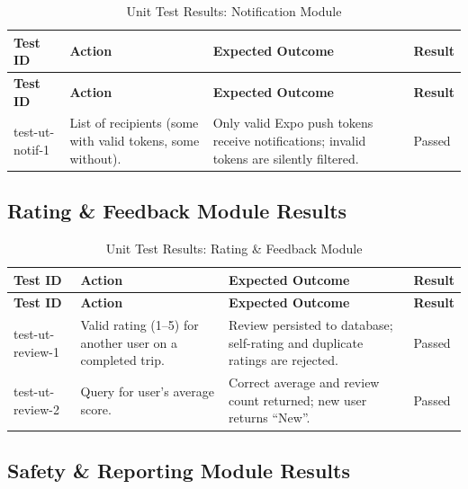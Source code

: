 \small
\begin{longtable}{|p{}|>{\raggedright\arraybackslash}p{}|>{\raggedright\arraybackslash}p{}|p{}|}
\hline
\textbf{Test ID} & \textbf{Action} & \textbf{Expected Outcome} & \textbf{Result} \\
\hline
\endfirsthead

\hline
\textbf{Test ID} & \textbf{Action} & \textbf{Expected Outcome} & \textbf{Result} \\
\hline
\endhead

\hline
\endfoot

\hline
\caption{Unit Test Results: Notification Module}
\endlastfoot

test-ut-notif-1 & List of recipients (some with valid tokens, some without). & Only valid Expo push tokens receive notifications; invalid tokens are silently filtered. & Passed \\
\hline
\end{longtable}

\subsection{Rating \& Feedback Module Results}

\small
\begin{longtable}{|p{}|>{\raggedright\arraybackslash}p{}|>{\raggedright\arraybackslash}p{}|p{}|}
\hline
\textbf{Test ID} & \textbf{Action} & \textbf{Expected Outcome} & \textbf{Result} \\
\hline
\endfirsthead

\hline
\textbf{Test ID} & \textbf{Action} & \textbf{Expected Outcome} & \textbf{Result} \\
\hline
\endhead

\hline
\endfoot

\hline
\caption{Unit Test Results: Rating \& Feedback Module}
\endlastfoot

test-ut-review-1 & Valid rating (1--5) for another user on a completed trip. & Review persisted to database; self-rating and duplicate ratings are rejected. & Passed \\
\hline
test-ut-review-2 & Query for user's average score. & Correct average and review count returned; new user returns ``New''. & Passed \\
\hline
\end{longtable}

\subsection{Safety \& Reporting Module Results}

